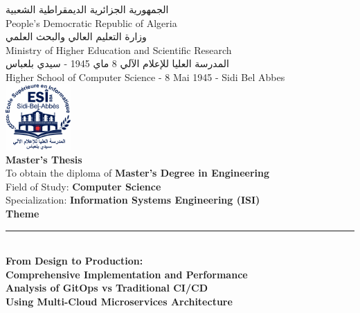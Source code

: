 \thispagestyle{empty}

\begin{center}

{\footnotesize \textarabic{الجمهورية الجزائرية الديمقراطية الشعبية}} \\[0.05cm]
{\footnotesize People's Democratic Republic of Algeria} \\[0.1cm]

{\footnotesize \textarabic{وزارة التعليم العالي والبحث العلمي}} \\[0.05cm]
{\footnotesize Ministry of Higher Education and Scientific Research} \\[0.1cm]

{\footnotesize \textarabic{المدرسة العليا للإعلام الآلي 8 ماي 1945 - سيدي بلعباس}} \\[0.05cm]
{\footnotesize Higher School of Computer Science - 8 Mai 1945 - Sidi Bel Abbes} \\[0.2cm]

\includegraphics[width=2.5cm]{figures/logos/esi-sba-logo.png} \\[0.15cm]

{\Large \textbf{Master's Thesis}} \\[0.25cm]

{\small To obtain the diploma of \textbf{Master's Degree in Engineering}} \\[0.08cm]
{\small Field of Study: \textbf{Computer Science}} \\[0.08cm]
{\small Specialization: \textbf{Information Systems Engineering (ISI)}} \\[0.35cm]

{\large \textbf{Theme}} \\[0.15cm]
\rule{14cm}{0.5pt} \\[0.25cm]

{\Large \textbf{From Design to Production:}} \\[0.15cm]
{\Large \textbf{Comprehensive Implementation and Performance}} \\[0.15cm]
{\Large \textbf{Analysis of GitOps vs Traditional CI/CD}} \\[0.15cm]
{\Large \textbf{Using Multi-Cloud Microservices Architecture}} \\[0.2cm]


\end{center}
